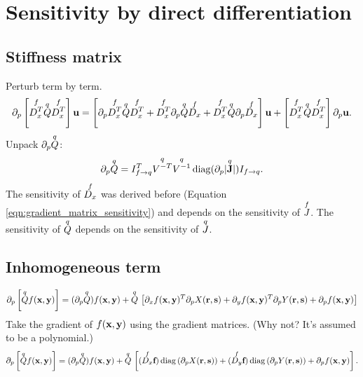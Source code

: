 \section{Sensitivity by direct differentiation}

\subsection{Stiffness matrix}

Perturb term by term.
%
\begin{equation}
\partial_p \left[ \overset{f}{D_x^T} \overset{q}{Q} \overset{f}{D_x^T} \right] \textbf{u} = \left[ \partial_p \overset{f}{D_x^T} \overset{q}{Q} \overset{f}{D_x^T} + \overset{f}{D_x^T} \partial_p \overset{q}{Q} \overset{f}{D_x} + \overset{f}{D_x^T} \overset{q}{Q} \partial_p \overset{f}{D_x} \right] \textbf{u} + \left[ \overset{f}{D_x^T} \overset{q}{Q} \overset{f}{D_x^T} \right] \partial_p \textbf{u}.
\end{equation}
%
Unpack $\partial_p \overset{q}{Q}$:
%
\begin{equation}
\partial_p \overset{q}{Q} = I_{f \rightarrow q}^T \overset{q}{V^{-T}} \overset{q}{V^{-1}} \operatorname{diag}( \partial_p |\overset{q}{\textbf{J}}| ) I_{f \rightarrow q}.
\end{equation}
%
The sensitivity of $\overset{f}{D_x}$ was derived before (Equation \ref{eqn:gradient_matrix_sensitivity}) and depends on the sensitivity of $\overset{f}{J}$.  The sensitivity of $\overset{q}{Q}$ depends on the sensitivity of $\overset{q}{J}$.

\subsection{Inhomogeneous term}

\begin{equation}
\begin{aligned}
\partial_p \left[ \overset{q}{Q} f(\textbf{x}, \textbf{y}) \right] =
(\partial_p \overset{q}{Q}) f(\textbf{x}, \textbf{y})
+ \overset{q}{Q} \,
\left[
\partial_x f(\textbf{x}, \textbf{y})^T \partial_p X(\textbf{r}, \textbf{s})
+ \partial_y f(\textbf{x}, \textbf{y})^T \partial_p Y(\textbf{r}, \textbf{s})
+ \partial_p f(\textbf{x}, \textbf{y})
\right]
\end{aligned}
\end{equation}
%
Take the gradient of $f(\textbf{x}, \textbf{y})$ using the gradient matrices.  (Why not?  It's assumed to be a polynomial.)
%
\begin{equation}
\label{eqn:curvilinear_inhomogeneous_sensitivity}
\partial_p \left[ \overset{q}{Q} f(\textbf{x}, \textbf{y}) \right] =
(\partial_p \overset{q}{Q}) f(\textbf{x}, \textbf{y})
+ \overset{q}{Q} \,
\left[
(\overset{f}{D_x} \textbf{f}) \operatorname{diag}\left( \partial_p X(\textbf{r}, \textbf{s}) \right)
+ (\overset{f}{D_y} \textbf{f}) \operatorname{diag} \left( \partial_p Y(\textbf{r}, \textbf{s}) \right)
+ \partial_p f(\textbf{x}, \textbf{y})
\right].
\end{equation}


